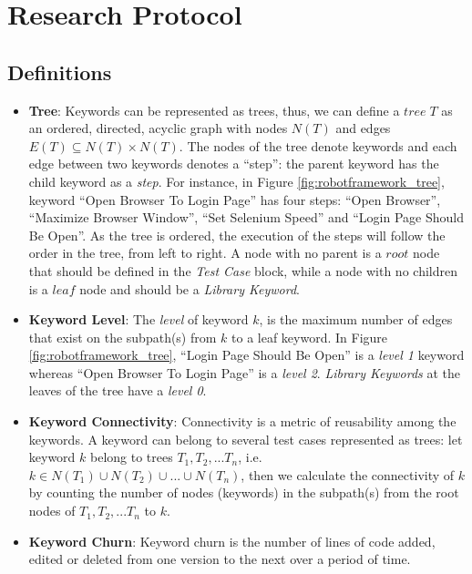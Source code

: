 \section{Research Protocol}

\subsection{Definitions}
\label{sec:evolution-protocol-definitions}

\begin{itemize}
    \item \textbf{Tree}: Keywords can be represented as trees, thus, we can define a $tree\; T$ as an ordered, directed, acyclic graph with nodes $N(T)$ and edges $E(T) \subseteq N(T) \times N(T)$. The nodes of the tree denote keywords and each edge between two keywords denotes a ``step'': the parent keyword has the child keyword as a \emph{step}. For instance, in Figure \ref{fig:robotframework_tree}, keyword ``Open Browser To Login Page'' has four steps: ``Open Browser'', ``Maximize Browser Window'', ``Set Selenium Speed'' and ``Login Page Should Be Open''. As the tree is ordered, the execution of the steps will follow the order in the tree, from left to right. A node with no parent is a $root$ node that should be defined in the \emph{Test Case} block,  while a node with no children is a $leaf$ node and should be a \emph{Library Keyword}.

    \item \textbf{Keyword Level}: The \emph{level} of keyword $k$, is the maximum number of edges that exist on the subpath(s) from $k$ to a leaf keyword. In Figure \ref{fig:robotframework_tree}, ``Login Page Should Be Open'' is a \emph{level 1} keyword whereas ``Open Browser To Login Page'' is a \emph{level 2}. \emph{Library Keywords} at the leaves of the tree have a \emph{level 0}.

    \item \textbf{Keyword Connectivity}: Connectivity is a metric of reusability among the keywords. A keyword can belong to several test cases represented as trees: let keyword $k$ belong to trees $T_1, T_2, ... T_n$, i.e. $k \in N(T_1) \cup N(T_2) \cup ... \cup N(T_n)$, then we calculate the connectivity of $k$ by counting the number of nodes (keywords) in the subpath(s) from the root nodes of $T_1, T_2, ... T_n$ to $k$.

    \item \textbf{Keyword Churn}: Keyword churn is the number of lines of code added, edited or deleted from one version to the next over a period of time.
\end{itemize}

